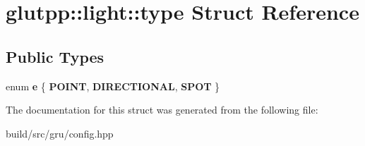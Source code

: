\hypertarget{structglutpp_1_1light_1_1type}{\section{glutpp\-:\-:light\-:\-:type \-Struct \-Reference}
\label{structglutpp_1_1light_1_1type}
}
\subsection*{\-Public \-Types}
\begin{DoxyCompactItemize}
\item 
enum {\bfseries e} \{ {\bfseries \-P\-O\-I\-N\-T}, 
{\bfseries \-D\-I\-R\-E\-C\-T\-I\-O\-N\-A\-L}, 
{\bfseries \-S\-P\-O\-T}
 \}
\end{DoxyCompactItemize}


\-The documentation for this struct was generated from the following file\-:\begin{DoxyCompactItemize}
\item 
build/src/gru/config.\-hpp\end{DoxyCompactItemize}
